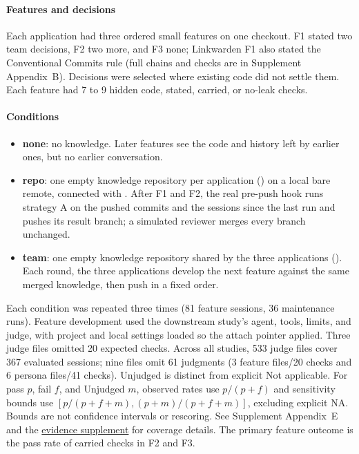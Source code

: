 \paragraph{Features and decisions} Each application had three ordered small features on one checkout. F1 stated two team decisions, F2 two more, and F3 none; Linkwarden F1 also stated the Conventional Commits rule (full chains and checks are in Supplement Appendix~B). Decisions were selected where existing code did not settle them. Each feature had 7 to 9 hidden code, stated, carried, or no-leak checks.

\paragraph{Conditions}
\begin{itemize}[nosep]
  \item \textbf{none}: no knowledge. Later features see the code and history left by earlier ones, but no earlier conversation.
  \item \textbf{repo}: one empty knowledge repository per application () on a local bare remote, connected with . After F1 and F2, the real pre-push hook runs strategy A on the pushed commits and the sessions since the last run and pushes its result branch; a simulated reviewer merges every branch unchanged.
  \item \textbf{team}: one empty knowledge repository shared by the three applications (). Each round, the three applications develop the next feature against the same merged knowledge, then push in a fixed order.
\end{itemize}
Each condition was repeated three times (81 feature sessions, 36 maintenance runs). Feature development used the downstream study's agent, tools, limits, and judge, with project and local settings loaded so the attach pointer applied. Three judge files omitted 20 expected checks. Across all studies, 533 judge files cover 367 evaluated sessions; nine files omit 61 judgments (3 feature files/20 checks and 6 persona files/41 checks). Unjudged is distinct from explicit Not applicable. For pass $p$, fail $f$, and Unjudged $m$, observed rates use $p/(p+f)$ and sensitivity bounds use $[p/(p+f+m),(p+m)/(p+f+m)]$, excluding explicit NA. Bounds are not confidence intervals or rescoring. See Supplement Appendix~E and the \href{context-ops-supplement.pdf}{evidence supplement} for coverage details. The primary feature outcome is the pass rate of carried checks in F2 and F3.

